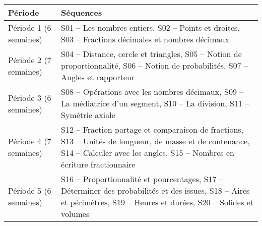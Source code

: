 \documentclass[12pt,a4paper]{book}
\begin{document}
\begin{center}
\begin{tabular}{|l|l|}
\hline
\textbf{Période} & \textbf{Séquences}\\ \hline
Période 1 (6 semaines) & S01 -- Les nombres entiers, S02 -- Points et droites, S03 -- Fractions décimales et nombres décimaux\\ \hline
Période 2 (7 semaines) & S04 -- Distance, cercle et triangles, S05 -- Notion de proportionnalité, S06 -- Notion de probabilités, S07 -- Angles et rapporteur\\ \hline
Période 3 (6 semaines) & S08 -- Opérations avec les nombres décimaux, S09 -- La médiatrice d'un segment, S10 -- La division, S11 -- Symétrie axiale\\ \hline
Période 4 (7 semaines) & S12 -- Fraction partage et comparaison de fractions, S13 -- Unités de longueur, de masse et de contenance, S14 -- Calculer avec les angles, S15 -- Nombres en écriture fractionnaire\\ \hline
Période 5 (6 semaines) & S16 -- Proportionnalité et pourcentages, S17 -- Déterminer des probabilités et des issues, S18 -- Aires et périmètres, S19 -- Heures et durées, S20 -- Solides et volumes\\ \hline
\end{tabular}
\end{center}
\end{document}
